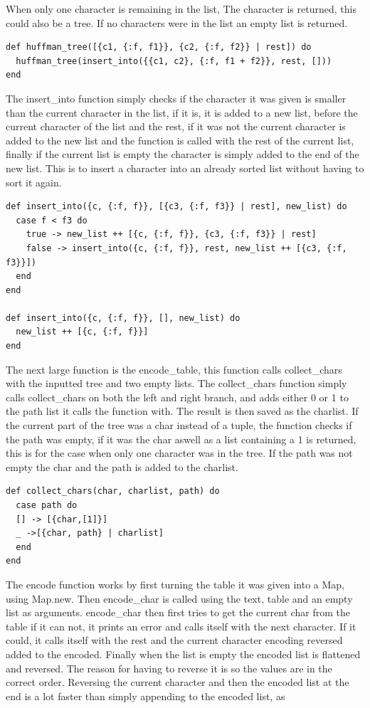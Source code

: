 \documentclass[a4paper,11pt]{article}
\begin{document}
When only one character is remaining in the list, The character is returned, this could also be a tree. If no characters were in the list an empty list is returned. 
\begin{verbatim}
def huffman_tree([{c1, {:f, f1}}, {c2, {:f, f2}} | rest]) do
  huffman_tree(insert_into({{c1, c2}, {:f, f1 + f2}}, rest, []))
end  
\end{verbatim}
The insert\_into function simply checks if the character it was given is smaller than the current character in the list, if it is, it is added to a new list, before the current character of the list and the rest, if it was not the current character is added to the new list and the function is called with the rest of the current list, finally if the current list is empty the character is simply added to the end of the new list. 
This is to insert a character into an already sorted list without having to sort it again. 
\begin{verbatim}
def insert_into({c, {:f, f}}, [{c3, {:f, f3}} | rest], new_list) do
  case f < f3 do
    true -> new_list ++ [{c, {:f, f}}, {c3, {:f, f3}} | rest]
    false -> insert_into({c, {:f, f}}, rest, new_list ++ [{c3, {:f, f3}}])
  end
end

def insert_into({c, {:f, f}}, [], new_list) do
  new_list ++ [{c, {:f, f}}]
end
\end{verbatim}
The next large function is the encode\_table, this function calls collect\_chars with the inputted tree and two empty lists. 
The collect\_chars function simply calls collect\_chars on both the left and right branch, and adds either 0 or 1 to the path list it calls the function with. The result is then saved as the charlist. If the current part of the tree was a char instead of a tuple, the function checks if the path was empty, if it was the char aswell as a list containing a 1 is returned, this is for the case when only one character was in the tree. If the path was not empty the char and the path is added to the charlist. 
\begin{verbatim}
def collect_chars(char, charlist, path) do
  case path do
  [] -> [{char,[1]}]
  _ ->[{char, path} | charlist]
  end
end
\end{verbatim}
The encode function works by first turning the table it was given into a Map, using Map.new. Then encode\_char is called using the text, table and an empty list as arguments. 
encode\_char then first tries to get the current char from the table if it can not, it prints an error and calls itself with the next character. If it could, it calls itself with the rest and the current character encoding reversed added to the encoded. Finally when the list is empty the encoded list is flattened and reversed. The reason for having to reverse it is so the values are in the correct order. Reversing the current character and then the encoded list at the end is a lot faster than simply appending to the encoded list, as 
\end{document}
